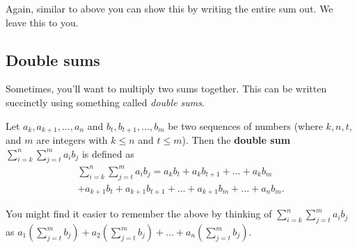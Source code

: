 \documentclass[
  12pt,
  a4paper, oneside]{starmastarticle}
\begin{document}
Again, similar to above you can show this by writing the entire sum out.
We leave this to you.

\begin{tcolorbox}[enhanced jigsaw, left=2mm, breakable, arc=.35mm, bottomrule=.15mm, opacityback=0, colframe=quarto-callout-note-color-frame, rightrule=.15mm, leftrule=.75mm, toprule=.15mm, colback=white]
\begin{minipage}[t]{5.5mm}
\textcolor{quarto-callout-note-color}{\faInfo}
\end{minipage}%
\begin{minipage}[t]{\textwidth - 5.5mm}

\end{minipage}%
\end{tcolorbox}

\hypertarget{double-sums}{%
\subsection{Double sums}\label{double-sums}}

Sometimes, you'll want to multiply two sums together. This can be
written succinctly using something called \emph{double sums}.

\begin{tcolorbox}[enhanced jigsaw, left=2mm, breakable, arc=.35mm, bottomrule=.15mm, opacityback=0, colframe=quarto-callout-note-color-frame, rightrule=.15mm, leftrule=.75mm, toprule=.15mm, colback=white]
\begin{minipage}[t]{5.5mm}
\textcolor{quarto-callout-note-color}{\faInfo}
\end{minipage}%
\begin{minipage}[t]{\textwidth - 5.5mm}
Let \(a_{k},a_{k+1},\ldots,a_n\) and \(b_t,b_{t+1},\ldots,b_m\) be two
sequences of numbers (where \(k,n,t\), and \(m\) are integers with
\(k \leq n\) and \(t \leq m\)). Then the \textbf{double sum}
\(\sum_{i=k}^n\sum_{j=t}^m a_i b_j\) is defined as
\[\begin{multline*} \sum_{i=k}^n\sum_{j=t}^m a_i b_j = a_kb_t + a_kb_{t+1} + \ldots + a_kb_m \\+ a_{k+1}b_t + a_{k+1}b_{t+1} + \ldots + a_{k+1}b_m + \ldots + a_nb_m.\end{multline*}\]\end{minipage}%
\end{tcolorbox}

\begin{tcolorbox}[enhanced jigsaw, bottomtitle=1mm, arc=.35mm, opacityback=0, title=\textcolor{quarto-callout-tip-color}{\faLightbulb}\hspace{0.5em}{Tip}, toprule=.15mm, colback=white, left=2mm, breakable, coltitle=black, toptitle=1mm, colbacktitle=quarto-callout-tip-color!10!white, colframe=quarto-callout-tip-color-frame, opacitybacktitle=0.6, rightrule=.15mm, bottomrule=.15mm, titlerule=0mm, leftrule=.75mm]
You might find it easier to remember the above by thinking of
\(\sum_{i=k}^n\sum_{j=t}^m a_i b_j\) as
\(a_1(\sum_{j=t}^mb_j) + a_2(\sum_{j=t}^mb_j) + \ldots + a_n(\sum_{j=t}^mb_j).\)
\end{tcolorbox}
\end{document}
